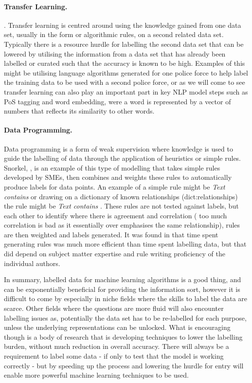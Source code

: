 \paragraph{Transfer Learning.}  \parencite{weiss2016survey,}. Transfer learning is centred around using the knowledge gained from one data set, usually in the form or algorithmic rules, on a second related data set. Typically there is a resource hurdle for labelling the second data set that can be lowered by utilising the information from a data set that has already been labelled or curated such that the accuracy is known to be high. Examples of this might be utilising language algorithms generated for one police force to help label the training data to be used with a second police force, or as we will come to see transfer learning can also play an important part in key NLP model steps such as PoS tagging and word embedding, were a word is represented by a vector of numbers that reflects its similarity to other words.


\paragraph{Data Programming.}  Data programming is a form of weak supervision where knowledge is used to guide the labelling of data through the application of heuristics or simple rules. Snorkel, \parencite{ratner2017snorkel}, is an example of this type of modelling that takes simple rules developed by SMEs, then combines and weights these rules to automatically produce labels for data points. An example of a simple rule might be \emph{Text contains } or drawing on a dictionary of known relationships (dict:relationships) the rule might be \emph{Text contains }. These rules are not tested against labels, but each other to identify where there is agreement and correlation ( too much correlation is bad as it essentially over emphasises the same relationship), rules are then weighted and labels generated. It was found in \textcite{ratner2017snorkel} that time spent generating rules was much more efficient than time spent labelling data, but that did depend on subject matter expertise and rule writing proficiency of the individual authors.


In summary, labelled data for machine learning algorithms is a good thing, and can be exponentially beneficial for providing the information sort, however it is difficult to come by especially in niche fields where the skills to label the data are scarce. Other fields where the questions are more fluid will also encounter labelling issues as, potentially the data set has to be re-labelled for each purpose, unless the underlying representations can be unlocked. What is encouraging though is a body of research that is developing techniques to lower the labelling burden, without much reduction in overall accuracy. There will always be a requirement to label some data - if only to test that the model is working correctly - but by speeding up the process and lowering the hurdle for entry will enable more powerful machine learning techniques to be used.

